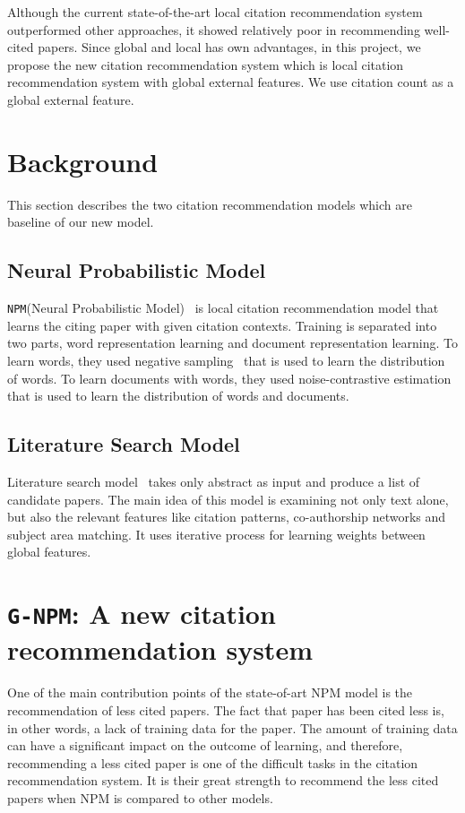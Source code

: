 \documentclass{llncs}
\newcommand{\name}{\texttt{G-NPM}\xspace}
\newcommand{\npm}{\texttt{NPM}\xspace}
\begin{document}
Although the current state-of-the-art local citation recommendation system~\cite{Huang:2015:NPM:2886521.2886655} outperformed other approaches, it showed relatively poor in recommending well-cited papers. Since global and local has own advantages, in this project, we propose the new citation recommendation system which is local citation recommendation system with global external features. We use citation count as a global external feature.


\section{Background}
This section describes the two citation recommendation models which are baseline of our new model.

\subsection{Neural Probabilistic Model}
\npm(Neural Probabilistic Model)~\cite{Huang:2015:NPM:2886521.2886655} is local citation recommendation model that learns the citing paper with given citation contexts. Training is separated into two parts, word representation learning and document representation learning. To learn words, they used negative sampling~\cite{mikolov2013distributed} that is used to learn the distribution of words. To learn documents with words, they used noise-contrastive estimation~\cite{gutmann2010noise} that is used to learn the distribution of words and documents.

\subsection{Literature Search Model}
Literature search model~\cite{Bethard:2010:ICL:1871437.1871517} takes only abstract as input and produce a list of candidate papers. The main idea of this model is examining not only text alone, but also the relevant features like citation patterns, co-authorship networks and subject area matching.
It uses iterative process for learning weights between global features.

\section{\name: A new citation recommendation system}

One of the main contribution points of the state-of-art NPM model is the recommendation of less cited papers. The fact that paper has been cited less is, in other words, a lack of training data for the paper. The amount of training data can have a significant impact on the outcome of learning, and therefore, recommending a less cited paper is one of the difficult tasks in the citation recommendation system. It is their great strength to recommend the less cited papers when NPM is compared to other models.
\end{document}

